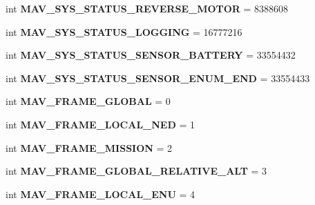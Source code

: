 \begin{DoxyCompactItemize}
int {\bfseries M\+A\+V\+\_\+\+S\+Y\+S\+\_\+\+S\+T\+A\+T\+U\+S\+\_\+\+R\+E\+V\+E\+R\+S\+E\+\_\+\+M\+O\+T\+OR} = 8388608
\item 
\mbox{\label{namespacepymavlink_1_1dialects_1_1v10_a546d9482c2c7e1c12d9b4f6210c1df77}} 
int {\bfseries M\+A\+V\+\_\+\+S\+Y\+S\+\_\+\+S\+T\+A\+T\+U\+S\+\_\+\+L\+O\+G\+G\+I\+NG} = 16777216
\item 
\mbox{\label{namespacepymavlink_1_1dialects_1_1v10_a855ef22072f44942f8285625ddd04a29}} 
int {\bfseries M\+A\+V\+\_\+\+S\+Y\+S\+\_\+\+S\+T\+A\+T\+U\+S\+\_\+\+S\+E\+N\+S\+O\+R\+\_\+\+B\+A\+T\+T\+E\+RY} = 33554432
\item 
\mbox{\label{namespacepymavlink_1_1dialects_1_1v10_af9d35a597dc7d9dfef970ead50c13841}} 
int {\bfseries M\+A\+V\+\_\+\+S\+Y\+S\+\_\+\+S\+T\+A\+T\+U\+S\+\_\+\+S\+E\+N\+S\+O\+R\+\_\+\+E\+N\+U\+M\+\_\+\+E\+ND} = 33554433
\item 
\mbox{\label{namespacepymavlink_1_1dialects_1_1v10_a51c0f4d6cc8e2dc76eec1d005d502f1e}} 
int {\bfseries M\+A\+V\+\_\+\+F\+R\+A\+M\+E\+\_\+\+G\+L\+O\+B\+AL} = 0
\item 
\mbox{\label{namespacepymavlink_1_1dialects_1_1v10_a3ed40f9c5687e36978c0341d998d0c2c}} 
int {\bfseries M\+A\+V\+\_\+\+F\+R\+A\+M\+E\+\_\+\+L\+O\+C\+A\+L\+\_\+\+N\+ED} = 1
\item 
\mbox{\label{namespacepymavlink_1_1dialects_1_1v10_aac9d904e4943ee7910a19be7b16d4f8b}} 
int {\bfseries M\+A\+V\+\_\+\+F\+R\+A\+M\+E\+\_\+\+M\+I\+S\+S\+I\+ON} = 2
\item 
\mbox{\label{namespacepymavlink_1_1dialects_1_1v10_ab4e44e487a8deaa3fcc08ab0bfb2407c}} 
int {\bfseries M\+A\+V\+\_\+\+F\+R\+A\+M\+E\+\_\+\+G\+L\+O\+B\+A\+L\+\_\+\+R\+E\+L\+A\+T\+I\+V\+E\+\_\+\+A\+LT} = 3
\item 
\mbox{\label{namespacepymavlink_1_1dialects_1_1v10_af7675c51a6bcc48d37b6253fd3e633b2}} 
int {\bfseries M\+A\+V\+\_\+\+F\+R\+A\+M\+E\+\_\+\+L\+O\+C\+A\+L\+\_\+\+E\+NU} = 4

\end{DoxyCompactItemize}
